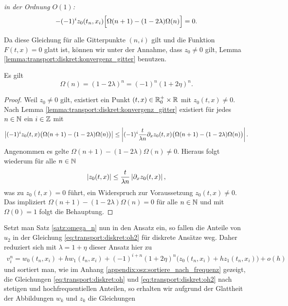\vspace{0.4cm}
\noindent \emph{in der Ordnung $O(1)$:}
\begin{align}\label{eq:transport:osz:o1} %
- (-1)^i z_0(t_n, x_i) \Bigl[ \Omega(n+1) - ( 1 - 2 \lambda ) \Omega(n) \Bigr] = 0.
\end{align}

Da diese Gleichung für alle Gitterpunkte $(n,i)$ gilt und die Funktion $F(t,x) = 0$ glatt ist, können wir unter der Annahme, dass $z_0 \neq 0$ gilt, Lemma \ref{lemma:transport:diskret:konvergenz_gitter} benutzen.
\begin{satz}\label{satz:omega_n}
Es gilt
\[ \Omega(n) = (1 - 2 \lambda)^n = (-1)^n (1 + 2 \eta)^n. \]
\end{satz}
\begin{proof}
Weil $z_0 \neq 0$ gilt, existiert ein Punkt $(t,x) \in \mathbb R^+_0 \times \mathbb R$ mit $z_0(t,x) \neq 0$.
Nach Lemma \ref{lemma:transport:diskret:konvergenz_gitter} existiert für jedes $n \in \mathbb N$ ein $i \in \mathbb Z$ mit
\[  \left| (-1)^i z_0(t, x) \bigl( \Omega(n+1) - ( 1 - 2 \lambda ) \Omega(n) \bigr) \right| \leq \left| (-1)^i \frac {t}{\lambda n} \partial_x z_0(t, x) \bigl( \Omega(n+1) - ( 1 - 2 \lambda ) \Omega(n) \bigr) \right|. \]
Angenommen es gelte $\Omega(n+1) - ( 1 - 2 \lambda ) \Omega(n) \neq 0$.
Hieraus folgt wiederum für alle $n \in \mathbb N$
\[ \left| z_0(t, x) \right| \leq \frac {t}{\lambda n} \left| \partial_x z_0(t,x) \right|, \]
was zu $z_0(t,x) = 0$ führt, ein Widerspruch zur Voraussetzung $z_0(t,x) \neq 0$.
Das impliziert $\Omega(n+1) - ( 1 - 2 \lambda ) \Omega(n) = 0$ für alle $n \in \mathbb N$ und mit $\Omega(0) = 1$ folgt die Behauptung.
\end{proof}

Setzt man Satz \ref{satz:omega_n} nun in den Ansatz ein, so fallen die Anteile von $u_2$ in der Gleichung \eqref{eq:transport:diskret:oh2} für diskrete Ansätze weg.
Daher reduziert sich mit $\lambda = 1 + \eta$ dieser Ansatz hier zu
\begin{align}\label{eq:transport:osz:ansatz}
v^n_i = w_0(t_n, x_i) + h  w_1(t_n, x_i) + (-1)^{i+n} (1 + 2 \eta)^n \bigl( z_0(t_n, x_i) + h z_1(t_n, x_i) \bigr) + o(h)
\end{align}
und sortiert man, wie im Anhang \ref{appendix:osz:sortiere_nach_frequenz} gezeigt, die Gleichungen \eqref{eq:transport:diskret:oh} und \eqref{eq:transport:diskret:oh2} nach stetigen und hochfrequentiellen Anteilen, so erhalten wir aufgrund der Glattheit der Abbildungen $w_k$ und $z_k$ die Gleichungen

